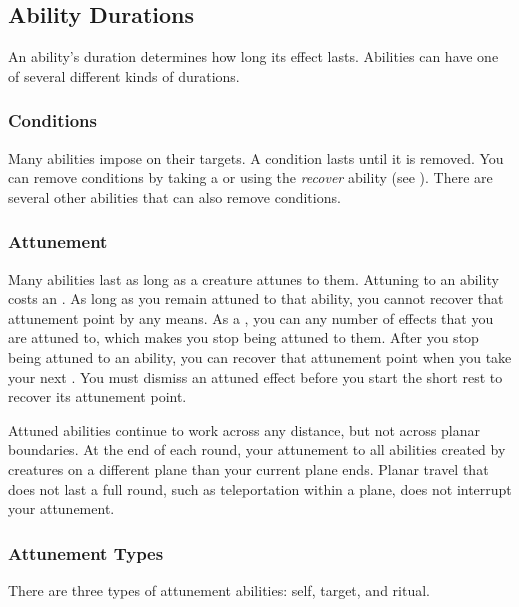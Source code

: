     \subsection{Ability Durations}\label{Ability Durations}

        An ability's duration determines how long its effect lasts.
        Abilities can have one of several different kinds of durations.

        \subsubsection{Conditions}\label{Conditions}
            Many abilities impose  on their targets.
            A condition lasts until it is removed.
            You can remove conditions by taking a  or using the \textit{recover} ability (see ).
            There are several other abilities that can also remove conditions.

        \subsubsection{Attunement}\label{Attunement}
            Many abilities last as long as a creature attunes to them.
            Attuning to an ability costs an .
            As long as you remain attuned to that ability, you cannot recover that attunement point by any means.
            As a , you can  any number of effects that you are attuned to, which makes you stop being attuned to them.
            After you stop being attuned to an ability, you can recover that attunement point when you take your next .
            You must dismiss an attuned effect before you start the short rest to recover its attunement point.

            Attuned abilities continue to work across any distance, but not across planar boundaries.
            At the end of each round, your attunement to all abilities created by creatures on a different plane than your current plane ends.
            Planar travel that does not last a full round, such as teleportation within a plane, does not interrupt your attunement.

            \subsubsection{Attunement Types}\label{Attunement Types}
                There are three types of attunement abilities: self, target, and ritual.


